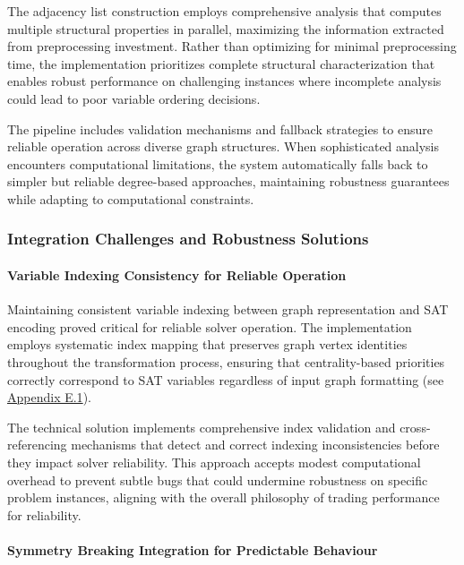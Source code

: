The adjacency list construction employs comprehensive analysis that computes multiple structural properties in parallel, maximizing the information extracted from preprocessing investment. Rather than optimizing for minimal preprocessing time, the implementation prioritizes complete structural characterization that enables robust performance on challenging instances where incomplete analysis could lead to poor variable ordering decisions.

The pipeline includes validation mechanisms and fallback strategies to ensure reliable operation across diverse graph structures. When sophisticated analysis encounters computational limitations, the system automatically falls back to simpler but reliable degree-based approaches, maintaining robustness guarantees while adapting to computational constraints.

\subsubsection{Integration Challenges and Robustness Solutions}

\paragraph{Variable Indexing Consistency for Reliable Operation}

Maintaining consistent variable indexing between graph representation and SAT encoding proved critical for reliable solver operation. The implementation employs systematic index mapping that preserves graph vertex identities throughout the transformation process, ensuring that centrality-based priorities correctly correspond to SAT variables regardless of input graph formatting (see \hyperref[appendix:variable-indexing]{Appendix E.1}).

The technical solution implements comprehensive index validation and cross-referencing mechanisms that detect and correct indexing inconsistencies before they impact solver reliability. This approach accepts modest computational overhead to prevent subtle bugs that could undermine robustness on specific problem instances, aligning with the overall philosophy of trading performance for reliability.

\paragraph{Symmetry Breaking Integration for Predictable Behaviour}

